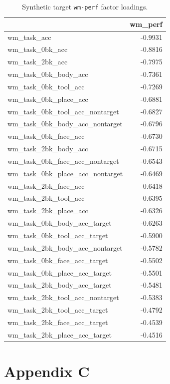 \documentclass{article}
\begin{document}
\begin{table}[H]
\caption{Synthetic target \texttt{wm-perf} factor loadings.}\label{tab:wm-perf}
\centering
\begin{tabular}{lr}
\toprule
 & wm\_perf \\
\midrule
wm\_task\_acc & -0.9931 \\
wm\_task\_0bk\_acc & -0.8816 \\
wm\_task\_2bk\_acc & -0.7975 \\
wm\_task\_0bk\_body\_acc & -0.7361 \\
wm\_task\_0bk\_tool\_acc & -0.7269 \\
wm\_task\_0bk\_place\_acc & -0.6881 \\
wm\_task\_0bk\_tool\_acc\_nontarget & -0.6827 \\
wm\_task\_0bk\_body\_acc\_nontarget & -0.6796 \\
wm\_task\_0bk\_face\_acc & -0.6730 \\
wm\_task\_2bk\_body\_acc & -0.6715 \\
wm\_task\_0bk\_face\_acc\_nontarget & -0.6543 \\
wm\_task\_0bk\_place\_acc\_nontarget & -0.6469 \\
wm\_task\_2bk\_face\_acc & -0.6418 \\
wm\_task\_2bk\_tool\_acc & -0.6395 \\
wm\_task\_2bk\_place\_acc & -0.6326 \\
wm\_task\_0bk\_body\_acc\_target & -0.6263 \\
wm\_task\_0bk\_tool\_acc\_target & -0.5900 \\
wm\_task\_2bk\_body\_acc\_nontarget & -0.5782 \\
wm\_task\_0bk\_face\_acc\_target & -0.5502 \\
wm\_task\_0bk\_place\_acc\_target & -0.5501 \\
wm\_task\_2bk\_body\_acc\_target & -0.5481 \\
wm\_task\_2bk\_tool\_acc\_nontarget & -0.5383 \\
wm\_task\_2bk\_tool\_acc\_target & -0.4792 \\
wm\_task\_2bk\_face\_acc\_target & -0.4539 \\
wm\_task\_2bk\_place\_acc\_target & -0.4516 \\
\bottomrule
\end{tabular}

\end{table}


\section{Appendix C}\label{sec:appendix-c}
\end{document}
